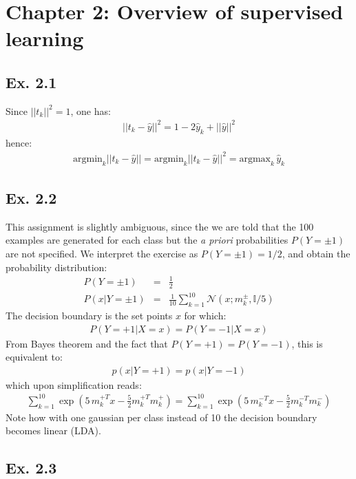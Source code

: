 \section*{Chapter 2: Overview of supervised learning}

\subsection*{Ex. 2.1}
Since $||t_k||^2 = 1$, one has:
\begin{eqnarray}
||t_k - \hat{y}||^2 = 1 - 2 \hat{y}_k + ||\hat{y}||^2
\end{eqnarray}
hence:
\begin{eqnarray}
\textrm{argmin}_k ||t_k - \hat{y}|| = \textrm{argmin}_k ||t_k - \hat{y}||^2 = 
\textrm{argmax}_k\, \hat{y}_k
\end{eqnarray}

\subsection*{Ex. 2.2}
This assignment is slightly ambiguous, since the  we are told that the 100 examples 
are generated for each class but the \textit{a priori} probabilities $P(Y = \pm 1)$
are not specified. We interpret the exercise as $P(Y = \pm 1) = 1/2$, and obtain the 
probability distribution:
\begin{eqnarray}
P(Y = \pm 1) & = & \frac{1}{2} \\
P(x | Y = \pm 1) & = & \frac{1}{10} \sum_{k=1}^{10} \mathcal{N}(x ; m_k ^{\pm}, \mathbb{I} / 5)
\end{eqnarray}
The decision boundary is the set points $x$ for which:
\begin{eqnarray}
P(Y = +1 |X = x) = P(Y = -1| X = x)
\end{eqnarray}
From Bayes theorem and the fact that $P(Y = +1) = P(Y =-1)$, this is equivalent to:
\begin{eqnarray}
p(x|Y = +1) = p(x|Y = -1)
\end{eqnarray}
which upon simplification reads:
\begin{eqnarray}
\sum_{k=1}^{10} \exp \left( 5\,m_k ^{+ T} x - \frac{5}{2} m_k ^{+ T} m_k^+ \right) = 
\sum_{k=1}^{10} \exp \left( 5\,m_k ^{- T} x - \frac{5}{2} m_k ^{- T} m_k^- \right)
\end{eqnarray}
Note how with one gaussian per class instead of 10 the decision boundary becomes 
linear (LDA).

\subsection*{Ex. 2.3}

